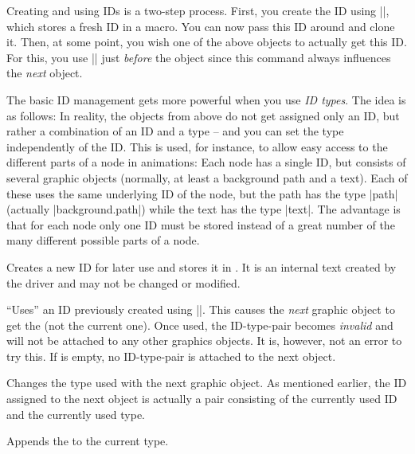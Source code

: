 Creating and using IDs is a two-step process. First, you create the
ID using |\pgfsys@new@id|, which stores a fresh ID in a macro. You can
now pass this ID around and clone it. Then, at some point, you wish
one of the above objects to actually get this ID. For this, you use
|\pgfsys@use@id| just \emph{before} the object since this command
always influences the \emph{next} object.

The basic ID management gets more powerful when you use \emph{ID
  types}. The idea is as follows: In reality, the objects from above
do not get assigned only an ID, but rather a combination of an ID and
a type -- and you can set the type independently of the ID. This is
used, for instance, to allow easy access to the different parts of a
node in animations: Each node has a single ID, but consists of several
graphic objects (normally, at least a background path and a
text). Each of these uses the same underlying ID of the node, but the
path has the type |path| (actually |background.path|) while the text
has the type |text|. The advantage is that for each node only one ID
must be stored instead of a great number of the many different
possible parts of a node.

\begin{command}{\pgfsys@new@id{}}
  Creates a new ID for later use and stores it in . It is
  an internal text created by the driver and may not be changed or
  modified. 
\end{command}

\begin{command}{\pgfsys@use@id{}}
  ``Uses'' an ID previously created using |\pgfsys@new@id|. This
  causes the \emph{next} graphic object to get the  (not the
  current one). Once used, the ID-type-pair becomes \emph{invalid} and
  will not be attached to any other graphics objects. It is, however,
  not an error to try this. If  is empty, no ID-type-pair is
  attached to the next object.
\end{command}

\begin{command}{\pgfsys@use@type{}}
  Changes the type used with the next graphic object.
  As mentioned earlier, the ID assigned to the next object is actually
  a pair consisting of the currently used ID and the currently used
  type. 
\end{command}

\begin{command}{\pgfsys@append@type{}}
  Appends the  to the current type. 
\end{command}

